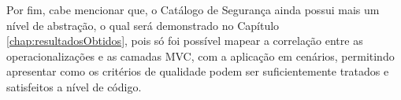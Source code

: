 Por fim, cabe mencionar que, o Catálogo de Segurança ainda possui mais um nível de abstração, o qual será demonstrado no Capítulo \ref{chap:resultadosObtidos}, pois só foi possível mapear a correlação entre as operacionalizações e as camadas MVC, 
com a aplicação em cenários, permitindo apresentar como os critérios de qualidade podem ser suficientemente tratados e satisfeitos a nível de código.
